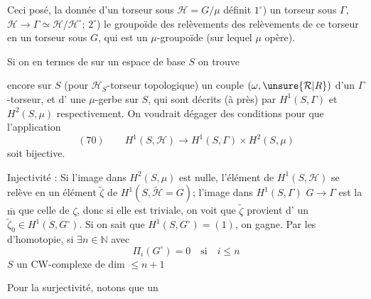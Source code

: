 Ceci posé, la donnée d'un torseur sous
$\mathcal H=G/\mu$ définit $1^\circ$) un torseur sous $\Gamma$,
$\mathcal H\longrightarrow\Gamma\simeq\mathcal H/\mathcal H^\circ$; $2^\circ$) le groupoïde des
relèvements des relèvements de ce torseur
en un torseur sous $G$, qui est un
$\mu$-groupoïde  (sur lequel $\mu$ opère).

Si on   en termes de 
sur un espace de base $S$ on trouve

encore sur $S$ (pour  $\mathcal H_S$-torseur topologique)
un couple $(\omega,\unsure{\mathcal R|R})$ d'un $\Gamma$-torseur, et d'
une $\mu$-gerbe sur $S$, qui sont décrits (à 
  près) par $H^1(S,\Gamma)$ et $H^2(S,\mu)$
respectivement. On voudrait dégager des
conditions  pour que l'application
\[
(70)\qquad H^1(S,\mathcal H)\longrightarrow H^1(S,\Gamma)\times H^2(S,\mu)
\]
soit bijective.

Injectivité : Si l'image 
dans $H^2(S,\mu)$ est nulle,
l'élément de $H^1(S,\mathcal H)$ se relève en un élément $\widetilde\zeta$
de $H^1(S,\widetilde{\mathcal H}=G)$;  l'image dans $H^1(S,\Gamma)$
 $G\longrightarrow\Gamma$ est la $\overline{\mathrm m}$ que celle de $\zeta$, donc si
elle est triviale, on voit que $\widetilde\zeta$ provient d'
un $\widetilde\zeta_0\in H^1(S,G^\circ)$. Si on sait que
$H^1(S,G^\circ)=(1)$, on gagne. Par les
 d'homotopie, 
si $\exists n\in\mathbb N$ avec
\[
\Pi_i(G^\circ)=0\quad\text{si}\quad i\leq n
\]
$S$ un CW-complexe de dim $\leq n+1$

Pour la surjectivité, notons que  un

